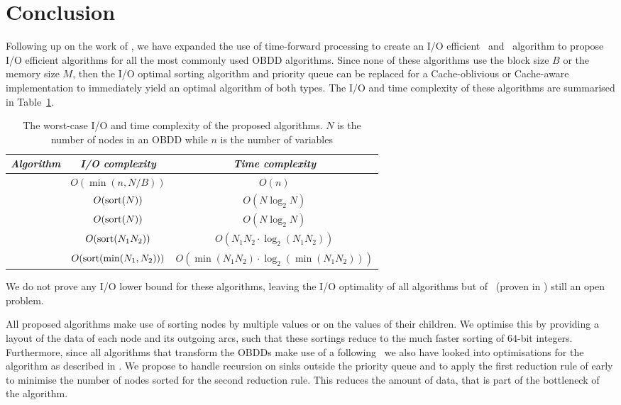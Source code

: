\section{Conclusion} \label{sec:conclusion}
Following up on the work of \cite{Arge96}, we have expanded the use of
time-forward processing to create an I/O efficient \Reduce\ and \Apply\
algorithm to propose I/O efficient algorithms for all the most commonly used
OBDD algorithms. Since none of these algorithms use the block size $B$ or the
memory size $M$, then the I/O optimal sorting algorithm and priority queue can
be replaced for a Cache-oblivious or Cache-aware implementation to immediately
yield an optimal algorithm of both types. The I/O and time complexity of these
algorithms are summarised in Table~\ref{tab:summary_efficiency}.

\begin{table}[ht!]
  \centering
  \begin{tabular}{c | c | c}
    \emph{Algorithm} & \emph{I/O complexity} & \emph{Time complexity}
    \\ \hline
    \Evaluate & $O(\min(n, N/B))$ & $O(n)$
    \\
    \Reduce & $O(\text{sort}(N))$ & $O(N \log_2 N)$
    \\
    \Restrict & $O(\text{sort}(N))$ & $O(N \log_2 N)$
    \\
    \Apply & $O(\text{sort}(N_1 N_2))$ & $O(N_1 N_2 \cdot \log_2 (N_1 N_2))$
    \\
    \Equal & $O(\text{sort}(\min(N_1, N_2)))$ & $O(\min(N_1 N_2) \cdot \log_2 (\min(N_1 N_2)))$
    \\
  \end{tabular}
  \caption{The worst-case I/O and time complexity of the proposed algorithms.
    $N$ is the number of nodes in an OBDD while $n$ is the number of variables}
  \label{tab:summary_efficiency}
\end{table}

We do not prove any I/O lower bound for these algorithms, leaving the I/O
optimality of all algorithms but of \Reduce\ (proven in \cite{Arge96}) still an
open problem.

All proposed algorithms make use of sorting nodes by multiple values or on the
values of their children. We optimise this by providing a layout of the data of
each node and its outgoing arcs, such that these sortings reduce to the much
faster sorting of $64$-bit integers. Furthermore, since all algorithms that
transform the OBDDs make use of a following \Reduce\ we also have looked into
optimisations for the algorithm as described in \cite{Arge96}. We propose to
handle recursion on sinks outside the priority queue and to apply the first
reduction rule of \cite{Bryant86} early to minimise the number of nodes sorted
for the second reduction rule. This reduces the amount of data, that is part of
the bottleneck of the algorithm.

